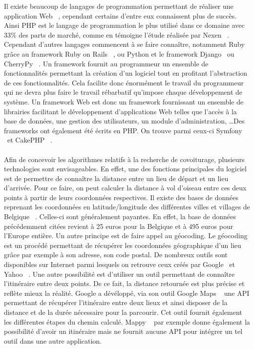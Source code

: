 \documentclass[12pt, a4paper, oneside]{article}
\begin{document}
    \indent Il existe beaucoup de langages de programmation permettant de réaliser une application Web ~\cite{web-development}, cependant certains d'entre eux connaissent plus de succès. Ainsi PHP est le langage de programmation le plus utilisé dans ce domaine avec 33$\%$ des parts de marché, comme en témoigne l'étude réalisée par Nexen ~\cite{stats-PHP}. Cependant d'autres langages commencent à se faire connaître, notamment Ruby grâce au framework Ruby on Rails ~\cite{ROR}, ou Python et le framework Django ~\cite{Django}ou CherryPy ~\cite{CherryPy}. Un framework fournit au programmeur un ensemble de fonctionnalités permettant la création d'un logiciel tout en profitant l'abstraction de ces fonctionnalités. Cela facilite donc énormément le travail du programmeur qui ne devra plus faire le travail rébarbatif qu'impose chaque développement de système. Un framework Web est donc un framework fournissant un ensemble de librairies facilitant le développement d'applications Web telles que l'accès à la base de données, une gestion des utilisateurs, un module d'administration, \dots Des frameworks ont également été écrits en PHP. On trouve parmi ceux-ci Symfony ~\cite{Symfony}et CakePHP ~\cite{CakePHP}.\\\\
    \indent Afin de concevoir les algorithmes relatifs à la recherche de covoiturage, plusieurs technologies sont envisageables. En effet, une des fonctions principales du logiciel est de permettre de connaître la distance entre un lieu de départ et un lieu d'arrivée. Pour ce faire, on peut calculer la distance à vol d'oiseau entre ces deux points à partir de leurs coordonnées respectives. Il existe des bases de données reprenant les coordonnées en latitude/longitude des différentes villes et villages de Belgique ~\cite{zip-code-DB}. Celles-ci sont généralement payantes. En effet, la base de données précédemment citées revient à 25 euros pour la Belgique et à 495 euros pour l'Europe entière. Un autre principe est de faire appel au géocoding. Le géocoding est un procédé permettant de récupérer les coordonnées géographique d'un lieu grâce par exemple à son adresse, son code postal. De nombreux outils sont disponibles sur Internet parmi lesquels on retrouve ceux créés par Google ~\cite{google-geoconding}et Yahoo ~\cite{yahoo-geocoding}. Une autre possibilité est d'utiliser un outil permettant de connaître l'itinéraire entre deux points. De ce fait, la distance retournée est plus précise et reflète mieux la réalité. Google a dévéloppé, via son outil Google Maps ~\cite{google-map} une API permettant de récupérer l'itinéraire entre deux lieux et ainsi disposer de la distance et de la durée nécessaire pour la parcourir. Cet outil fournit également les différentes étapes du chemin calculé. Mappy ~\cite{Mappy} par exemple donne également la possibilité d'avoir un itinéraire mais ne fournit aucune API pour intégrer un tel outil dans une autre application.
\end{document}
